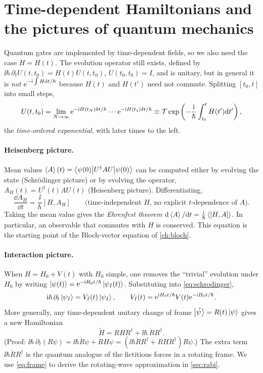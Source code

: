 \section{Time-dependent Hamiltonians and the pictures of quantum mechanics}
Quantum gates are implemented by time-dependent fields, so we also need the case $H=H(t)$. The evolution operator still exists, defined by
$\ii\hbar\,\partial_tU(t,t_0)=H(t)U(t,t_0)$, $U(t_0,t_0)=I$, and is unitary, but in general it is \emph{not} $\mathrm e^{-\mathrm i\int H\mathrm d t/\hbar}$
because $H(t)$ and $H(t')$ need not commute. Splitting $[t_0,t]$ into small steps,
\begin{equation}
  U(t,t_0)=\lim_{N\to\infty}\mathrm e^{-\mathrm i H(t_N)\delta t/\hbar}\cdots\mathrm e^{-\mathrm i H(t_1)\delta t/\hbar}\equiv
  \mathcal T\exp\left(-\frac{\mathrm i}\hbar\int_{t_0}^tH(t')\mathrm d t'\right),
\end{equation}
the \emph{time-ordered exponential}, with later times to the left.

\paragraph{Heisenberg picture.} Mean values $\left\langle A\right\rangle(t)=\left\langle\psi(0)\middle|U^\dagger AU\middle|\psi(0)\right\rangle$ can be computed either by evolving the
state (Schrödinger picture) or by evolving the operator, $A_H(t)=U^\dagger(t)AU(t)$ (Heisenberg picture). Differentiating,
\begin{equation}\label{eq:heisenberg}
  \frac{\dd A_H}{\dd t}=\frac\ii\hbar[H,A_H]\qquad\text{(time-independent $H$, no explicit $t$-dependence of $A$)}.
\end{equation}
Taking the mean value gives the \emph{Ehrenfest theorem} $\mathrm d\left\langle A\right\rangle/\mathrm d t=\frac{\mathrm i}\hbar\left\langle[H,A]\right\rangle$. In particular, an observable that
commutes with $H$ is conserved. This equation is the starting point of the Bloch-vector equation of \cref{ch:bloch}.

\paragraph{Interaction picture.} When $H=H_0+V(t)$ with $H_0$ simple, one removes the ``trivial'' evolution under $H_0$ by writing
$\left|\psi(t)\right\rangle=\mathrm e^{-\mathrm i H_0t/\hbar}\left|\psi_I(t)\right\rangle$. Substituting into \cref{eq:schrodinger},
\begin{equation}\label{eq:interaction}
  \mathrm i\hbar\,\partial_t\left|\psi_I\right\rangle=V_I(t)\left|\psi_I\right\rangle,\qquad V_I(t)=\mathrm e^{\mathrm i H_0t/\hbar}V(t)\mathrm e^{-\mathrm i H_0t/\hbar}.
\end{equation}
More generally, any time-dependent unitary change of frame $\left|\tilde\psi\right\rangle=R(t)\left|\psi\right\rangle$ gives a new Hamiltonian
\begin{equation}\label{eq:frame}
  \tilde H=RHR^\dagger+\ii\hbar\,\dot RR^\dagger.
\end{equation}
(Proof: $\ii\hbar\,\partial_t(R\psi)=\ii\hbar\dot R\psi+R H\psi=(\ii\hbar\dot RR^\dagger+RHR^\dagger)R\psi$.) The extra term
$\ii\hbar\dot RR^\dagger$ is the quantum analogue of the fictitious forces in a rotating frame. We use \cref{eq:frame} to derive the
rotating-wave approximation in \cref{sec:rabi}.

